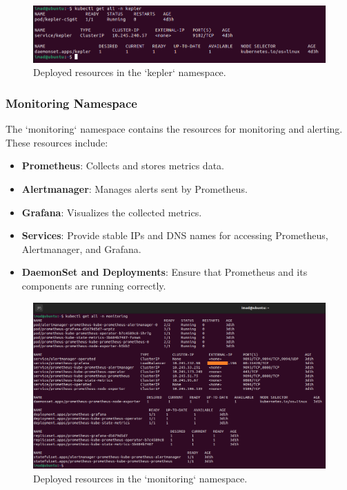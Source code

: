 \begin{figure}[H]
    \centering
    \includegraphics[width=\linewidth]{Figures/kepler-monitoring-resources.png}
    \caption{Deployed resources in the `kepler` namespace.}
    \label{fig:kepler-resources}
\end{figure}

\subsubsection{Monitoring Namespace}

The `monitoring` namespace contains the resources for monitoring and alerting. These resources include:

\begin{itemize}
    \item \textbf{Prometheus}: Collects and stores metrics data.
    \item \textbf{Alertmanager}: Manages alerts sent by Prometheus.
    \item \textbf{Grafana}: Visualizes the collected metrics.
    \item \textbf{Services}: Provide stable IPs and DNS names for accessing Prometheus, Alertmanager, and Grafana.
    \item \textbf{DaemonSet and Deployments}: Ensure that Prometheus and its components are running correctly.
\end{itemize}

\begin{figure}[H]
    \centering
    \includegraphics[width=\linewidth]{Figures/monitoring-namespace-resources.png}
    \caption{Deployed resources in the `monitoring` namespace.}
    \label{fig:monitoring-resources}
\end{figure}

